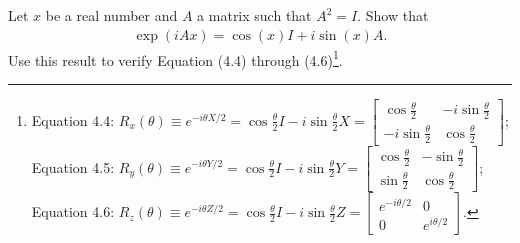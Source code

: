 \documentclass[en]{sol-man}
\begin{document}
\begin{exe}
    Let $x$ be a real number and $A$ a matrix such that $A^2=I$. Show that
    \begin{align}
        \label{E4.2}
        \exp(iAx)=\cos(x)I+i\sin(x)A.
    \end{align}
    Use this result to verify Equation (4.4) through (4.6)\footnote{Equation 4.4: $R_x(\theta)\equiv e^{-i\theta X/2}=\cos\frac{\theta}{2}I-i\sin\frac{\theta}{2}X=\begin{bmatrix}
        \cos\frac{\theta}{2}&-i\sin\frac{\theta}{2}\\
        -i\sin\frac{\theta}{2}&\cos\frac{\theta}{2}
    \end{bmatrix}$;\\
    Equation 4.5: $R_y(\theta)\equiv e^{-i\theta Y/2}=\cos\frac{\theta}{2}I-i\sin\frac{\theta}{2}Y=\begin{bmatrix}
        \cos\frac{\theta}{2}&-\sin\frac{\theta}{2}\\
        \sin\frac{\theta}{2}&\cos\frac{\theta}{2}
    \end{bmatrix}$;\\
    Equation 4.6: $R_z(\theta)\equiv e^{-i\theta Z/2}=\cos\frac{\theta}{2}I-i\sin\frac{\theta}{2}Z=\begin{bmatrix}
        e^{-i\theta/2}&0\\
        0&e^{i\theta/2}
    \end{bmatrix}$.}.
\end{exe}
\end{document}
